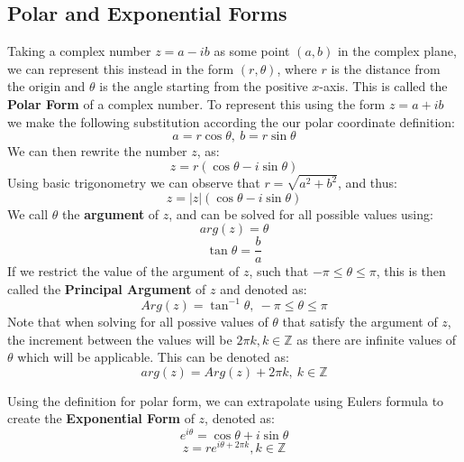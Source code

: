 \documentclass[a4paper]{article}
\begin{document}
  \subsection{Polar and Exponential Forms}
  Taking a complex number $z= a - ib$ as some point $(a,b)$ in the complex plane, we can represent this instead in the form $(r,\theta)$, where $r$ is the distance from the origin and $\theta$ is the angle starting from the positive $x$-axis. This is called the \textbf{Polar Form} of a complex number. To represent this using the form $z=a+ib$ we make the following substitution according the our polar coordinate definition:
  \[
    a = r \cos\theta, \ b = r \sin \theta
  \]
  We can then rewrite the number $z$, as:
  \[
    z = r(\cos\theta - i\sin\theta)
  \]
  Using basic trigonometry we can observe that $r = \sqrt{a^2 + b^2}$, and thus:
  \[
    z = |z|(\cos\theta - i\sin\theta)
  \]
  We call $\theta$ the \textbf{argument} of $z$, and can be solved for all possible values using:
  \[
    arg(z) = \theta
  \]
  \[
    \tan\theta = \frac{b }{a}
  \]
  If we restrict the value of the argument of $z$, such that $-\pi \leq \theta \leq \pi$, this is then called the \textbf{Principal Argument} of $z$ and denoted as:
  \[
    Arg(z) = \tan^{-1} \theta, \ -\pi \leq \theta \leq \pi
  \]
  Note that when solving for all possive values of $\theta$ that satisfy the argument of $z$, the increment between the values will be $2\pi k, k\in \mathbb{Z}$ as there are infinite values of $\theta$ which will be applicable. This can be denoted as:
  \[
    arg(z) = Arg(z) + 2 \pi k, \ k \in \mathbb{Z}
  \]

  Using the definition for polar form, we can extrapolate using Eulers formula to create the \textbf{Exponential Form} of $z$, denoted as:
  \[
    e^{i\theta} = \cos\theta + i \sin\theta
  \]
  \[
    z = re^{i\theta + 2\pi k}, k \in \mathbb{Z}
  \]
\end{document}
